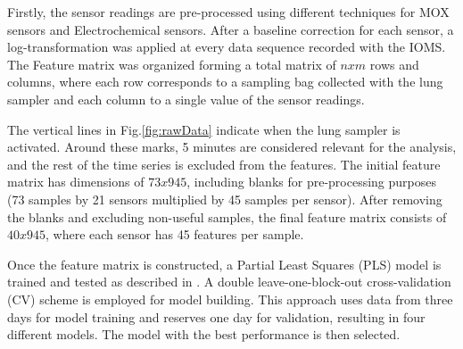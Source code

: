 \documentclass[final,3p,times,twocolumn]{elsarticle}
\begin{document}
Firstly, the sensor readings are pre-processed using different techniques for MOX sensors and Electrochemical sensors. After a baseline correction for each sensor, a log-transformation was applied at every data sequence recorded with the IOMS. The Feature matrix was organized forming a total matrix of $nxm$ rows and columns, where each row corresponds to a sampling bag collected with the lung sampler and each column to a single value of the sensor readings. 

The vertical lines in Fig.\ref{fig:rawData} indicate when the lung sampler is activated. Around these marks, 5 minutes are considered relevant for the analysis, and the rest of the time series is excluded from the features. The initial feature matrix has dimensions of $73x945$, including blanks for pre-processing purposes (73 samples by 21 sensors multiplied by 45 samples per sensor). After removing the blanks and excluding non-useful samples, the final feature matrix consists of $40x945$, where each sensor has 45 features per sample.



Once the feature matrix is constructed, a Partial Least Squares (PLS) model is trained and tested as described in \cite{Wold2001}. A double leave-one-block-out cross-validation (CV) scheme is employed for model building. This approach uses data from three days for model training and reserves one day for validation, resulting in four different models. The model with the best performance is then selected. 
\end{document}
